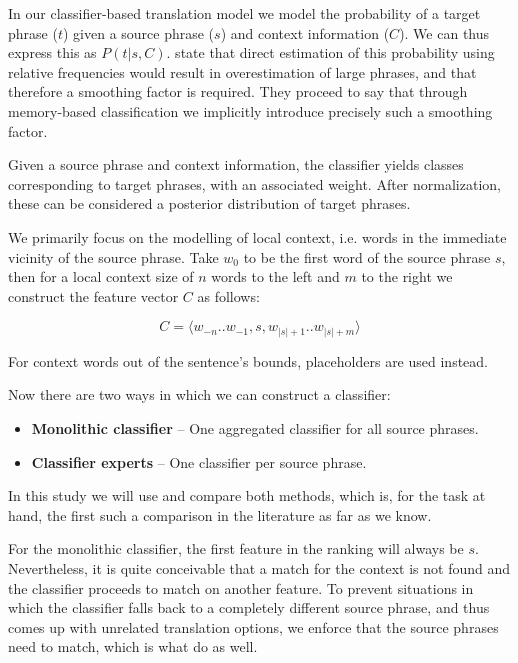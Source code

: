\documentclass[smallextended]{svjour3}       %
\theoremstyle{break}
\begin{document}
In our classifier-based translation model we model the probability
of a target phrase ($t$) given a source phrase ($s$) and context information
($C$). We can thus express this as $P(t|s,C)$.  \cite{Stroppa+07} state that
direct estimation of this probability using relative frequencies would result
in overestimation of large phrases, and that therefore a smoothing factor is
required. They proceed to say that through memory-based classification we
implicitly introduce precisely such a smoothing factor.

Given a source phrase and context information, the classifier yields classes
corresponding to target phrases, with an associated weight. After
normalization, these can be considered a posterior distribution of
target phrases. 

We primarily focus on the modelling of local context, i.e. words in the
immediate vicinity of the source phrase. Take $w_0$ to be the first word of
the source phrase $s$, then for a local context size of $n$ words to the left and
$m$ to the right we construct the feature vector $C$ as follows:

\begin{equation}
  C = \langle w_{-n} .. w_{-1} , s , w_{|s|+1} .. w_{|s|+m} \rangle
\end{equation}

For context words out of the sentence's bounds, placeholders are used instead.

Now there are two ways in which we can construct a classifier:

\begin{itemize}
  \item \textbf{Monolithic classifier} -- One aggregated classifier for all
    source phrases.
  \item \textbf{Classifier experts} -- One classifier per source phrase.
\end{itemize}

In this study we will use and compare both methods, which is, for the task at
hand, the first such a comparison in the literature as far as we know.

For the monolithic classifier, the first feature in the ranking will always be
$s$. Nevertheless, it is quite conceivable that a match for the context is not
found and the classifier proceeds to match on another feature. To prevent
situations in which the classifier falls back to a completely different source
phrase, and thus comes up with unrelated translation options, we enforce that
the source phrases need to match, which is what \cite{Stroppa+07} do as
well.
\end{document}
